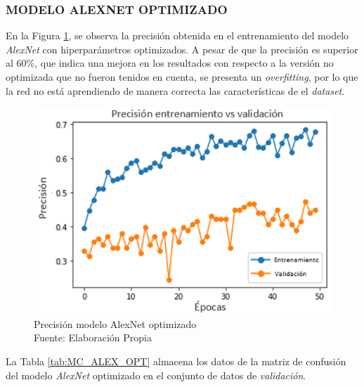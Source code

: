 \subsubsection{\MakeUppercase{Modelo AlexNet optimizado}}

En la Figura \ref{fig:preci_Alex_OPT}, se observa la precisión obtenida en el entrenamiento del modelo \textit{AlexNet} con hiperparámetros optimizados. A pesar de que la precisión es superior al $60\%$, que indica una mejora en los resultados con respecto a la versión no optimizada que no fueron tenidos en cuenta, se presenta un \textit{overfitting}, por lo que la red no está aprendiendo de manera correcta las características de el \textit{dataset}.

\begin{figure}[ht]
	\centering
	\includegraphics[scale=0.7]{Figs/500.png}
	\caption{Precisión modelo AlexNet optimizado\\ Fuente: Elaboración Propia}
	\label{fig:preci_Alex_OPT}
\end{figure}

\newpage
La Tabla \ref{tab:MC_ALEX_OPT} almacena los datos de la matriz de confusión del modelo \textit{AlexNet} optimizado en el conjunto de datos de \textit{validación}.

